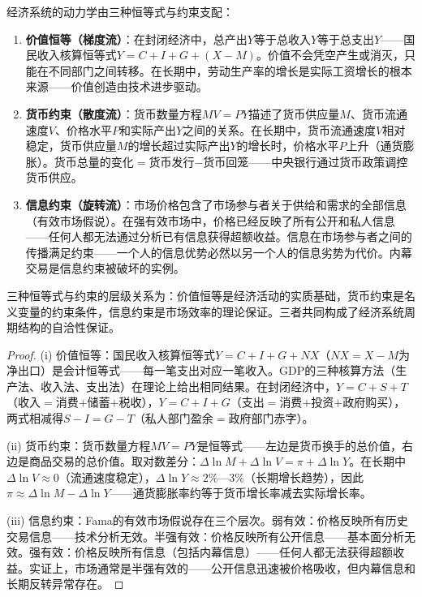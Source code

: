 \begin{theorem}[经济系统的三种恒等式与约束]\label{thm:economic_conservation}
经济系统的动力学由三种恒等式与约束支配：
\begin{enumerate}[label=(\roman*)]
    \item \textbf{价值恒等（梯度流）}：在封闭经济中，总产出$Y$等于总收入$Y$等于总支出$Y$——国民收入核算恒等式$Y = C + I + G + (X - M)$。价值不会凭空产生或消灭，只能在不同部门之间转移。在长期中，劳动生产率的增长是实际工资增长的根本来源——价值创造由技术进步驱动。
    \item \textbf{货币约束（散度流）}：货币数量方程$MV = PY$描述了货币供应量$M$、货币流通速度$V$、价格水平$P$和实际产出$Y$之间的关系。在长期中，货币流通速度$V$相对稳定，货币供应量$M$的增长超过实际产出$Y$的增长时，价格水平$P$上升（通货膨胀）。货币总量的变化$=$货币发行$-$货币回笼——中央银行通过货币政策调控货币供应。
    \item \textbf{信息约束（旋转流）}：市场价格包含了市场参与者关于供给和需求的全部信息（有效市场假说）。在强有效市场中，价格已经反映了所有公开和私人信息——任何人都无法通过分析已有信息获得超额收益。信息在市场参与者之间的传播满足约束——一个人的信息优势必然以另一个人的信息劣势为代价。内幕交易是信息约束被破坏的实例。
\end{enumerate}
三种恒等式与约束的层级关系为：价值恒等是经济活动的实质基础，货币约束是名义变量的约束条件，信息约束是市场效率的理论保证。三者共同构成了经济系统周期结构的自洽性保证。
\end{theorem}

\begin{proof}
(i) 价值恒等：国民收入核算恒等式$Y = C + I + G + NX$（$NX = X - M$为净出口）是会计恒等式——每一笔支出对应一笔收入。GDP的三种核算方法（生产法、收入法、支出法）在理论上给出相同结果。在封闭经济中，$Y = C + S + T$（收入$=$消费$+$储蓄$+$税收），$Y = C + I + G$（支出$=$消费$+$投资$+$政府购买），两式相减得$S - I = G - T$（私人部门盈余$=$政府部门赤字）。

(ii) 货币约束：货币数量方程$MV = PY$是恒等式——左边是货币换手的总价值，右边是商品交易的总价值。取对数差分：$\Delta\ln M + \Delta\ln V = \pi + \Delta\ln Y$。在长期中$\Delta\ln V \approx 0$（流通速度稳定），$\Delta\ln Y \approx 2\%$—$3\%$（长期增长趋势），因此$\pi \approx \Delta\ln M - \Delta\ln Y$——通货膨胀率约等于货币增长率减去实际增长率。

(iii) 信息约束：Fama的有效市场假说存在三个层次。弱有效：价格反映所有历史交易信息——技术分析无效。半强有效：价格反映所有公开信息——基本面分析无效。强有效：价格反映所有信息（包括内幕信息）——任何人都无法获得超额收益。实证上，市场通常是半强有效的——公开信息迅速被价格吸收，但内幕信息和长期反转异常存在。
\end{proof}

